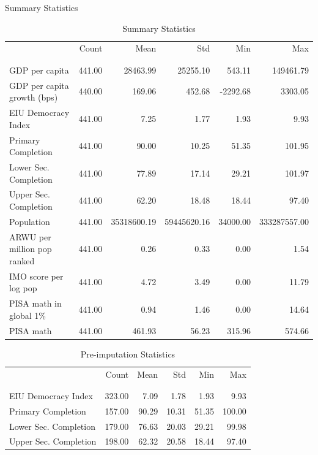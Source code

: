 \documentclass[10pt]{beamer}
\begin{document}
\begin{frame}{Summary Statistics}
    \begin{table}
        \caption{Summary Statistics}
        \resizebox{\linewidth}{!} {
            \begin{tabular}{lrrrrr}
                & Count & Mean & Std & Min & Max \\
                \\[-1.8ex]\hline
                \hline \\[-1.8ex]
               GDP per capita & 441.00 & 28463.99 & 25255.10 & 543.11 & 149461.79 \\
               GDP per capita growth (bps) & 440.00 & 169.06 & 452.68 & -2292.68 & 3303.05 \\
               EIU Democracy Index & 441.00 & 7.25 & 1.77 & 1.93 & 9.93 \\
               Primary Completion & 441.00 & 90.00 & 10.25 & 51.35 & 101.95 \\
               Lower Sec. Completion & 441.00 & 77.89 & 17.14 & 29.21 & 101.97 \\
               Upper Sec. Completion & 441.00 & 62.20 & 18.48 & 18.44 & 97.40 \\
               Population & 441.00 & 35318600.19 & 59445620.16 & 34000.00 & 333287557.00 \\
               ARWU per million pop ranked & 441.00 & 0.26 & 0.33 & 0.00 & 1.54 \\
               IMO score per log pop & 441.00 & 4.72 & 3.49 & 0.00 & 11.79 \\
               PISA math in global 1\% & 441.00 & 0.94 & 1.46 & 0.00 & 14.64 \\
               PISA math & 441.00 & 461.93 & 56.23 & 315.96 & 574.66 \\
               \end{tabular}
        }
    \end{table}
    \begin{table}
        \tiny
        \caption{Pre-imputation Statistics}
        \begin{tabular}{lrrrrr}
         & Count & Mean & Std & Min & Max \\
         \\[-1.8ex]\hline
         \hline \\[-1.8ex]
        EIU Democracy Index & 323.00 & 7.09 & 1.78 & 1.93 & 9.93 \\
        Primary Completion & 157.00 & 90.29 & 10.31 & 51.35 & 100.00 \\
        Lower Sec. Completion & 179.00 & 76.63 & 20.03 & 29.21 & 99.98 \\
        Upper Sec. Completion & 198.00 & 62.32 & 20.58 & 18.44 & 97.40 \\
        \end{tabular}
        \end{table}
\end{frame}
\end{document}
